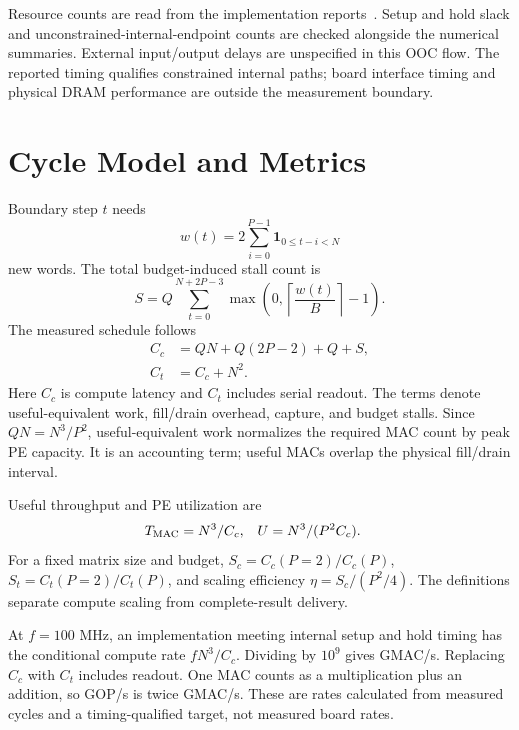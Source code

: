 \documentclass[conference]{IEEEtran}
\providecommand{\AnalysisPath}{../../results/analysis}
\begin{document}
Resource counts are read from the implementation reports~\cite{amd}. Setup and hold slack and unconstrained-internal-endpoint counts are checked alongside the numerical summaries. External input/output delays are unspecified in this OOC flow. The reported timing qualifies constrained internal paths; board interface timing and physical DRAM performance are outside the measurement boundary.

\section{Cycle Model and Metrics}
Boundary step $t$ needs
\begin{equation}
w(t)=2\sum_{i=0}^{P-1}\mathbf{1}_{0\leq t-i<N}
\end{equation}
new words. The total budget-induced stall count is
\begin{equation}
S=Q\sum_{t=0}^{N+2P-3}\max\left(0,\left\lceil\frac{w(t)}{B}\right\rceil-1\right).
\end{equation}
The measured schedule follows
\begin{align}
C_c &= QN+Q(2P-2)+Q+S,\\
C_t &= C_c+N^2.
\end{align}
Here $C_c$ is compute latency and $C_t$ includes serial readout. The terms denote useful-equivalent work, fill/drain overhead, capture, and budget stalls. Since $QN=N^3/P^2$, useful-equivalent work normalizes the required MAC count by peak PE capacity. It is an accounting term; useful MACs overlap the physical fill/drain interval.

Useful throughput and PE utilization are
\begin{align}
T_{\rm MAC}&=N^3/C_c, & U&=N^3/(P^2 C_c).
\end{align}
For a fixed matrix size and budget, $S_c=C_c(P=2)/C_c(P)$, $S_t=C_t(P=2)/C_t(P)$, and scaling efficiency $\eta=S_c/(P^2/4)$. The definitions separate compute scaling from complete-result delivery.

At $f=100$ MHz, an implementation meeting internal setup and hold timing has the conditional compute rate $fN^3/C_c$. Dividing by $10^9$ gives GMAC/s. Replacing $C_c$ with $C_t$ includes readout. One MAC counts as a multiplication plus an addition, so GOP/s is twice GMAC/s. These are rates calculated from measured cycles and a timing-qualified target, not measured board rates.

\begin{table}[t]
\centering\small
\caption{All eighteen simulation configurations. $C_c$ is compute latency, $C_t$ includes serial readout, and $S$ counts budget stalls. $S_c$/$S_t$ are speedups over the matching 2-by-2 grid; $\eta$ is PE-count scaling efficiency.}

\label{tab:sim}
\end{table}
\end{document}
